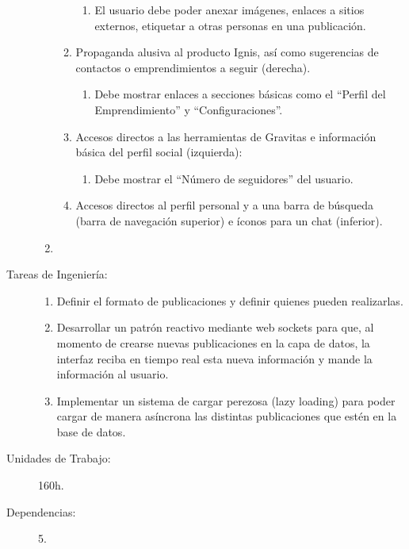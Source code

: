 \begin{description}
\begin{enumerate}
\begin{enumerate}
\begin{enumerate}
                        \item El usuario debe poder anexar imágenes, enlaces a sitios externos, etiquetar a otras personas en una publicación.
                    \end{enumerate}
                \item Propaganda alusiva al producto Ignis, así como sugerencias de contactos o emprendimientos a seguir (derecha).
                    \begin{enumerate}
                        \item Debe mostrar enlaces a secciones básicas como el “Perfil del Emprendimiento” y “Configuraciones”.
                    \end{enumerate}
                \item Accesos directos a las herramientas de Gravitas e información básica del perfil social (izquierda):
                    \begin{enumerate}
                        \item Debe mostrar el “Número de seguidores” del usuario.
                    \end{enumerate}
                \item Accesos directos al perfil personal y a una barra de búsqueda (barra de navegación superior) e íconos para un chat (inferior).
                \end{enumerate}
            \item 
        \end{enumerate}
    \item[Tareas de Ingeniería:] \hfill
        \begin{enumerate}
            \item Definir el formato de publicaciones y definir quienes pueden realizarlas.
            \item Desarrollar un patrón reactivo mediante web sockets para que, al momento de crearse nuevas publicaciones en la capa de datos, la interfaz reciba en tiempo real esta nueva información y mande la información al usuario.
            \item Implementar un sistema de cargar perezosa (lazy loading) para poder cargar de manera asíncrona las distintas publicaciones que estén en la base de datos.
        \end{enumerate}
    \item[Unidades de Trabajo:] 160h.
    \item[Dependencias:] 5.
\end{description}

